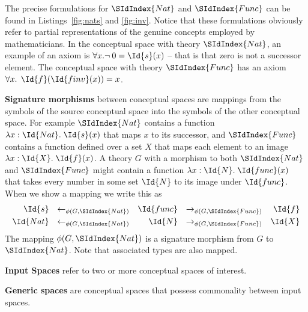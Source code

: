 The precise formulations for $\SIdIndex{Nat}$ and $ \SIdIndex{Func}$ can
be found in Listings~\ref{fig:nats} and \ref{fig:inv}. 
Notice that these formulations obviously refer to 
partial representations of the genuine concepts
employed by mathematicians.  
In the conceptual space with theory $\SIdIndex{Nat}$, an example of an axiom is 
$\forall x. \neg \: 0 = \Id{s}(x)$ -- that is that zero is not a successor element.
The conceptual space with theory $\SIdIndex{Func}$ has an axiom
$\forall x.\:\:\Id{f}(\Id{finv}(x)) = x$. 

{\bf Signature morphisms} between conceptual spaces are mappings from
the symbols of the source conceptual space into the symbols of the other
conceptual space. 
%
For example $\SIdIndex{Nat}$ contains a function $\lambda
x:\Id{Nat}.\;\Id{s}(x)$ that maps $x$ to its successor, and
$\SIdIndex{Func}$ contains a function defined over a set $X$ that maps
each element to an image $\lambda x:\Id{X}.\;\Id{f}(x)$.  A theory $G$
with a morphism to both $\SIdIndex{Nat}$ and $\SIdIndex{Func}$ might
contain a function $\lambda x:\Id{N}.\;\Id{func}(x)$ that takes every
number in some set $\Id{N}$ to its image under $\Id{func}$.
%
When we show a mapping %
we write 
this as
\begin{align}
  \Id{s}&&\leftarrow_{\phi(G,\SIdIndex{Nat})}&&\Id{func}&&\rightarrow_{\phi(G,\SIdIndex{Func})}&&\Id{f}\\
  \Id{Nat}&&\leftarrow_{\phi(G,\SIdIndex{Nat})}&&\Id{N}&&\rightarrow_{\phi(G,\SIdIndex{Func})}&&\Id{X}
\end{align}
\noindent The mapping $\phi(G,\SIdIndex{Nat})$ is a signature morphism from
$G$ to $\SIdIndex{Nat}$. Note that associated types are also mapped.

{\bf Input Spaces} refer to two or more conceptual spaces of
interest. 

{\bf Generic spaces} are conceptual spaces that possess commonality
between input spaces. 

